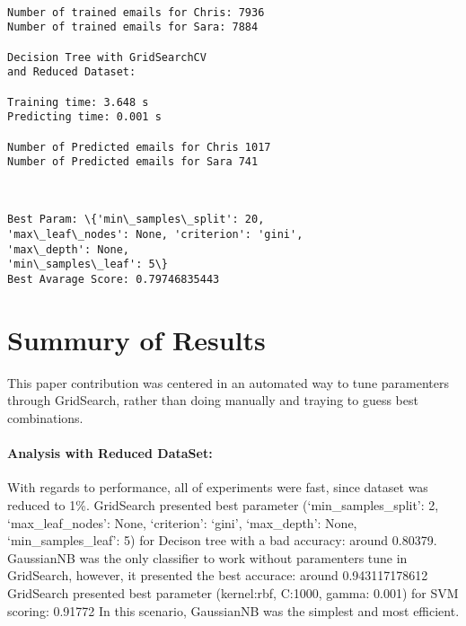 \documentclass[11pt]{article}
\begin{document}
\begin{multicols}{2}
    \begin{Verbatim}[commandchars=\\\{\}]

Number of trained emails for Chris: 7936
Number of trained emails for Sara: 7884

Decision Tree with GridSearchCV
and Reduced Dataset:

Training time: 3.648 s
Predicting time: 0.001 s

Number of Predicted emails for Chris 1017
Number of Predicted emails for Sara 741

    \end{Verbatim}

    \begin{center}
    \end{center}
    { \hspace*{\fill} \\}
    
    \begin{Verbatim}[commandchars=\\\{\}]
Best Param: \{'min\_samples\_split': 20,  
'max\_leaf\_nodes': None, 'criterion': 'gini', 
'max\_depth': None, 
'min\_samples\_leaf': 5\}
Best Avarage Score: 0.79746835443

    \end{Verbatim}

    \section{Summury of Results}\label{summury-of-results}

This paper contribution was centered in an automated way to tune
paramenters through GridSearch, rather than doing manually and traying
to guess best combinations.

\paragraph{Analysis with Reduced
DataSet:}\label{analysis-with-reduced-dataset}

With regards to performance, all of experiments were fast, since dataset
was reduced to 1\%. GridSearch presented best parameter
(`min\_samples\_split': 2, `max\_leaf\_nodes': None, `criterion':
`gini', `max\_depth': None, `min\_samples\_leaf': 5) for Decison tree
with a bad accuracy: around 0.80379. GaussianNB was the only classifier
to work without paramenters tune in GridSearch, however, it presented
the best accurace: around 0.943117178612 GridSearch presented best
parameter (kernel:rbf, C:1000, gamma: 0.001) for SVM scoring: 0.91772 In
this scenario, GaussianNB was the simplest and most efficient.


\end{multicols}
\end{document}

